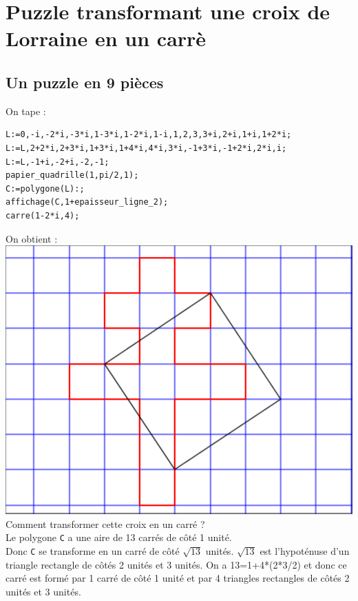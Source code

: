 \documentclass[a4paper,11pt]{book}
\begin{document}
\section{Puzzle transformant une croix de Lorraine en un carr\`e}
\subsection{Un puzzle en 9 pi\`eces}
On tape :
\begin{verbatim}
L:=0,-i,-2*i,-3*i,1-3*i,1-2*i,1-i,1,2,3,3+i,2+i,1+i,1+2*i;
L:=L,2+2*i,2+3*i,1+3*i,1+4*i,4*i,3*i,-1+3*i,-1+2*i,2*i,i;
L:=L,-1+i,-2+i,-2,-1;
papier_quadrille(1,pi/2,1);
C:=polygone(L):;
affichage(C,1+epaisseur_ligne_2);
carre(1-2*i,4);
\end{verbatim}
On obtient :\\
\includegraphics[width=\textwidth]{puzzlecroix10}\\
Comment transformer cette croix en un carr\'e ?\\
Le polygone {\tt C} a une aire de 13 carr\'es de c\^ot\'e 1 unit\'e.\\
Donc {\tt C} se transforme en un carr\'e de c\^ot\'e $\sqrt{13}$ unit\'es.
$\sqrt{13}$ est l'hypot\'enuse d'un triangle rectangle de c\^ot\'es 2 unit\'es
et 3 unit\'es. On a 13=1+4*(2*3/2) et donc ce carr\'e est form\'e par 1 carr\'e
de c\^ot\'e  1 unit\'e et par 4 triangles rectangles de c\^ot\'es 2 unit\'es
et 3 unit\'es.\\
\end{document}
